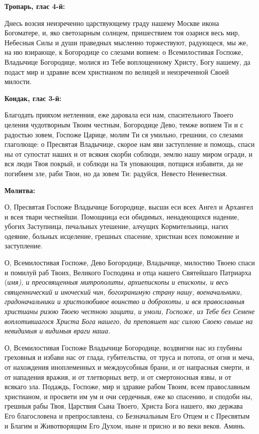 
\bfseries Тропарь, глас 4-й:\normalfont{}


Днесь возсия неизреченно царствующему граду нашему Москве икона Богоматере, и, яко светозарным солнцем, пришествием тоя озарися весь мир, Небесныя Силы и души праведных мысленно торжествуют, радующеся, мы же, на ню взирающе, к Богородице со слезами вопием: о Всемилостивая Госпоже, Владычице Богородице, молися из Тебе воплощенному Христу, Богу нашему, да подаст мир и здравие всем христианом по велицей и неизреченной Своей милости.


\medskip


\bfseries Кондак, глас 3-й:\normalfont{}


Благодать прияхом нетленния, еже даровала еси нам, спасительного Твоего целения чудотворным Твоим честным, Богородице Дево, темже вопием Ти и с радостью зовем, Госпоже Царице, молим Ти ся умильно, грешнии, со слезами глаголюще: о Пресвятая Владычице, скорое нам яви заступление и помощь, спаси ны от супостат наших и от всякия скорби соблюди, землю нашу миром огради, и вся люди Твоя покрый, и соблюди на Тя уповающия, потщися избавити, да не погибнем зле, раби Твои, но да зовем Ти: радуйся, Невесто Неневестная.


\medskip


\bfseries Молитва:\normalfont{}


О, Пресвятая Госпоже Владычице Богородице, высши еси всех Ангел и Архангел и всея твари честнейши. Помощница еси обидимых, ненадеющихся надение, убогих Заступница, печальных утешение, алчущих Кормительница, нагих одеяние, больных исцеление, грешных спасение, христиан всех поможение и заступление. 


О, Всемилостивая Госпоже, Дево Богородице, Владычице, милостию Твоею спаси и помилуй раб Твоих, Великого Господина и отца нашего Святейшаго Патриарха (\itshape имя\normalfont{}), и преосвященныя митрополиты, архиепископы и епископы, и весь священнический и иноческий чин, богохранимую страну нашу, военачальники, градоначальники и христолюбивое воинство и доброхоты, и вся православныя христианы ризою Твоею честною защити, и умоли, Госпоже, из Тебе без Семене воплотившагося Христа Бога нашего, да препояшет нас силою Своею свыше на невидимыя и видимыя враги наша. 

О, Всемилостивая Госпоже Владычице Богородице, воздвигни нас из глубины греховныя и избави нас от глада, губительства, от труса и потопа, от огня и меча, от нахождения иноплеменных и междоусобныя брани, и от напрасныя смерти, и от нападения вражия, и от тлетворных ветр, и от смертоносныя язвы, и от всякаго зла. Подаждь, Госпоже, мир и здравие рабом Твоим, всем православным христианом, и просвети им ум и очи сердечныя, еже ко спасению, и сподоби ны, грешныя рабы Твоя, Царствия Сына Твоего, Христа Бога нашего, яко держава Его благословена и препрославлена, со Безначальным Его Отцем и с Пресвятым и Благим и Животворящим Его Духом, ныне и присно и во веки веков. Аминь.


